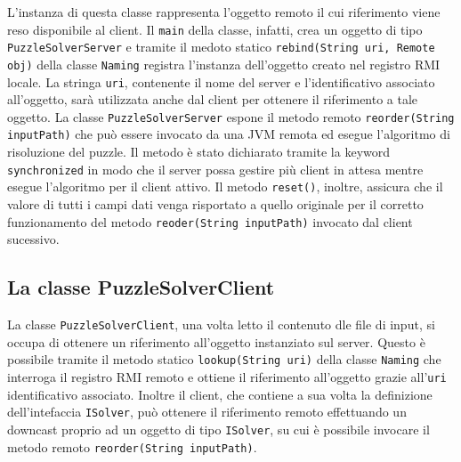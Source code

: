 L'instanza di questa classe rappresenta l'oggetto remoto il cui riferimento viene reso disponibile al client.
Il \texttt{main} della classe, infatti, crea un oggetto di tipo \texttt{PuzzleSolverServer} e tramite il medoto statico
\texttt{rebind(String uri, Remote obj)} della classe \texttt{Naming} registra l'instanza dell'oggetto creato nel
registro RMI locale. La stringa \texttt{uri}, contenente il nome del server e l'identificativo associato all'oggetto, sarà
utilizzata anche dal client per ottenere il riferimento a tale oggetto.
La classe \texttt{PuzzleSolverServer} espone il metodo remoto \texttt{reorder(String inputPath)} che può essere invocato
da una JVM remota ed esegue l'algoritmo di risoluzione del puzzle. Il metodo è stato dichiarato tramite la keyword
\texttt{synchronized} in modo che il server possa gestire più client in attesa mentre esegue l'algoritmo per il client attivo.
Il metodo \texttt{reset()}, inoltre, assicura che il valore di tutti i campi dati venga risportato a quello originale per
il corretto funzionamento del metodo \texttt{reoder(String inputPath)} invocato dal client sucessivo.


\subsection{La classe PuzzleSolverClient}

La classe \texttt{PuzzleSolverClient}, una volta letto il contenuto dle file di input, si occupa di ottenere un riferimento
all'oggetto instanziato sul server. Questo è possibile tramite il metodo statico \texttt{lookup(String uri)} della classe
\texttt{Naming} che interroga il registro RMI remoto e ottiene il riferimento all'oggetto grazie all'\texttt{uri} identificativo
associato. Inoltre il client, che contiene a sua volta la definizione dell'intefaccia \texttt{ISolver}, può ottenere il
riferimento remoto effettuando un downcast proprio ad un oggetto di tipo \texttt{ISolver}, su cui è possibile invocare il metodo
remoto \texttt{reorder(String inputPath)}.
